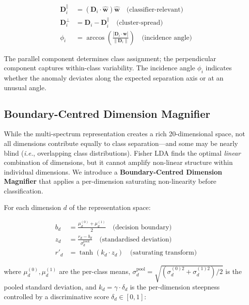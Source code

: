 \documentclass[journal]{IEEEtran}
\newcommand{\ie}{\textit{i.e.}}
\newcommand{\norm}[1]{\left\lVert#1\right\rVert}
\begin{document}
\begin{align}
\mathbf{D}_i^{\parallel} &= (\mathbf{D}_i \cdot \hat{\mathbf{w}}) \hat{\mathbf{w}} \quad\text{(classifier-relevant)} \label{eq:parallel} \\
\mathbf{D}_i^{\perp} &= \mathbf{D}_i - \mathbf{D}_i^{\parallel} \quad\text{(cluster-spread)} \label{eq:perp} \\
\phi_i &= \arccos\!\left(\frac{|\mathbf{D}_i \cdot \hat{\mathbf{w}}|}{\norm{\mathbf{D}_i}}\right) \quad\text{(incidence angle)} \label{eq:angle}
\end{align}

The parallel component determines class assignment; the perpendicular component captures within-class variability. The incidence angle $\phi_i$ indicates whether the anomaly deviates along the expected separation axis or at an unusual angle.

\subsection{Boundary-Centred Dimension Magnifier}
\label{ssec:magnifier}

While the multi-spectrum representation creates a rich 20-dimensional space, not all dimensions contribute equally to class separation---and some may be nearly blind (\ie, overlapping class distributions). Fisher LDA finds the optimal \textit{linear} combination of dimensions, but it cannot amplify non-linear structure within individual dimensions. We introduce a \textbf{Boundary-Centred Dimension Magnifier} that applies a per-dimension saturating non-linearity before classification.

For each dimension $d$ of the representation space:

\begin{align}
b_d &= \frac{\mu_d^{(0)} + \mu_d^{(1)}}{2} \quad\text{(decision boundary)} \label{eq:boundary} \\
z_d &= \frac{r_d - b_d}{\sigma_d^{\text{pool}}} \quad\text{(standardised deviation)} \label{eq:std_dev} \\
r'_d &= \tanh(k_d \cdot z_d) \quad\text{(saturating transform)} \label{eq:tanh}
\end{align}

where $\mu_d^{(0)}, \mu_d^{(1)}$ are the per-class means, $\sigma_d^{\text{pool}} = \sqrt{(\sigma_d^{(0)2} + \sigma_d^{(1)2})/2}$ is the pooled standard deviation, and $k_d = \gamma \cdot \delta_d$ is the per-dimension steepness controlled by a discriminative score $\delta_d \in [0, 1]$:
\end{document}
